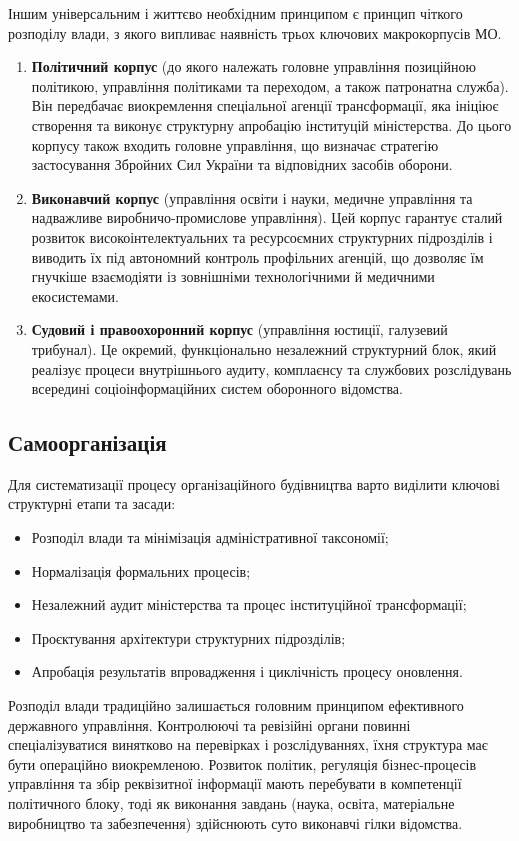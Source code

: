 Іншим універсальним і життєво необхідним принципом є принцип чіткого розподілу влади, з якого випливає наявність трьох ключових макрокорпусів МО.
\begin{enumerate}
    \item \textbf{Політичний корпус} (до якого належать головне управління позиційною політикою, управління політиками та переходом, а також патронатна служба). Він передбачає виокремлення спеціальної агенції трансформації, яка ініціює створення та виконує структурну апробацію інституцій міністерства. До цього корпусу також входить головне управління, що визначає стратегію застосування Збройних Сил України та відповідних засобів оборони.
    \item \textbf{Виконавчий корпус} (управління освіти і науки, медичне управління та надважливе виробничо-промислове управління). Цей корпус гарантує сталий розвиток високоінтелектуальних та ресурсоємних структурних підрозділів і виводить їх під автономний контроль профільних агенцій, що дозволяє їм гнучкіше взаємодіяти із зовнішніми технологічними й медичними екосистемами.
    \item \textbf{Судовий і правоохоронний корпус} (управління юстиції, галузевий трибунал). Це окремий, функціонально незалежний структурний блок, який реалізує процеси внутрішнього аудиту, комплаєнсу та службових розслідувань всередині соціоінформаційних систем оборонного відомства.
\end{enumerate}

\newpage
\subsection*{Самоорганізація}

Для систематизації процесу організаційного будівництва варто виділити ключові структурні етапи та засади:

\begin{itemize}
    \item Розподіл влади та мінімізація адміністративної таксономії;
    \item Нормалізація формальних процесів;
    \item Незалежний аудит міністерства та процес інституційної трансформації;
    \item Проєктування архітектури структурних підрозділів;
    \item Апробація результатів впровадження і циклічність процесу оновлення.
\end{itemize}

Розподіл влади традиційно залишається головним принципом ефективного державного управління. Контролюючі та ревізійні органи повинні спеціалізуватися винятково на перевірках і розслідуваннях, їхня структура має бути операційно виокремленою. Розвиток політик, регуляція бізнес-процесів управління та збір реквізитної інформації мають перебувати в компетенції політичного блоку, тоді як виконання завдань (наука, освіта, матеріальне виробництво та забезпечення) здійснюють суто виконавчі гілки відомства.

